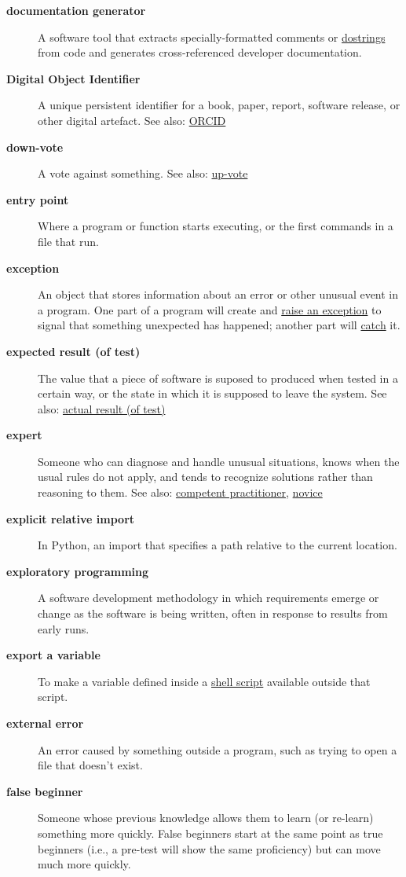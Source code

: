 \documentclass[
]{krantz}
\begin{document}
\begin{description}
\item[\textbf{documentation generator}]
A software tool that extracts specially-formatted comments or \protect\hyperlink{docstring}{dostrings} from code and generates cross-referenced developer documentation.
\item[\textbf{Digital Object Identifier}]
A unique persistent identifier for a book, paper, report, software release, or other digital artefact. See also: \protect\hyperlink{orcid}{ORCID}
\item[\textbf{down-vote}]
A vote against something. See also: \protect\hyperlink{up_vote}{up-vote}
\item[\textbf{entry point}]
Where a program or function starts executing, or the first commands in a file that run.
\item[\textbf{exception}]
An object that stores information about an error or other unusual event in a program. One part of a program will create and \protect\hyperlink{raise_exception}{raise an exception} to signal that something unexpected has happened; another part will \protect\hyperlink{catch_exception}{catch} it.
\item[\textbf{expected result (of test)}]
The value that a piece of software is suposed to produced when tested in a certain way, or the state in which it is supposed to leave the system. See also: \protect\hyperlink{actual_result}{actual result (of test)}
\item[\textbf{expert}]
Someone who can diagnose and handle unusual situations, knows when the usual rules do not apply, and tends to recognize solutions rather than reasoning to them. See also: \protect\hyperlink{competent_practitioner}{competent practitioner}, \protect\hyperlink{novice}{novice}
\item[\textbf{explicit relative import}]
In Python, an import that specifies a path relative to the current location.
\item[\textbf{exploratory programming}]
A software development methodology in which requirements emerge or change as the software is being written, often in response to results from early runs.
\item[\textbf{export a variable}]
To make a variable defined inside a \protect\hyperlink{shell_script}{shell script} available outside that script.
\item[\textbf{external error}]
An error caused by something outside a program, such as trying to open a file that doesn't exist.
\item[\textbf{false beginner}]
Someone whose previous knowledge allows them to learn (or re-learn) something more quickly. False beginners start at the same point as true beginners (i.e., a pre-test will show the same proficiency) but can move much more quickly.

\end{description}
\end{document}
